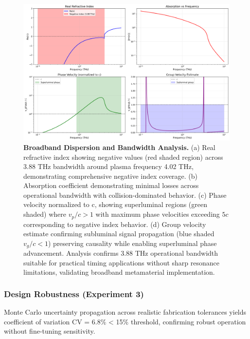 \documentclass[aps,prl,reprint,groupedaddress,floatfix]{revtex4-1}
\begin{document}
\begin{figure}[t]
    \centering
    \includegraphics[width=1.0\textwidth]{experiment2_dispersion_bandwidth.png}
    \caption{\textbf{Broadband Dispersion and Bandwidth Analysis.} (a) Real refractive index showing negative values (red shaded region) across 3.88 THz bandwidth around plasma frequency 4.02 THz, demonstrating comprehensive negative index coverage. (b) Absorption coefficient demonstrating minimal losses across operational bandwidth with collision-dominated behavior. (c) Phase velocity normalized to c, showing superluminal regions (green shaded) where $v_p/c > 1$ with maximum phase velocities exceeding $5c$ corresponding to negative index behavior. (d) Group velocity estimate confirming subluminal signal propagation (blue shaded $v_g/c < 1$) preserving causality while enabling superluminal phase advancement. Analysis confirms 3.88 THz operational bandwidth suitable for practical timing applications without sharp resonance limitations, validating broadband metamaterial implementation.}
    \label{fig:dispersion_analysis}
\end{figure}

\subsubsection{Design Robustness (Experiment 3)}

Monte Carlo uncertainty propagation across realistic fabrication tolerances yields coefficient of variation CV = 6.8\% < 15\% threshold, confirming robust operation without fine-tuning sensitivity.
\end{document}
